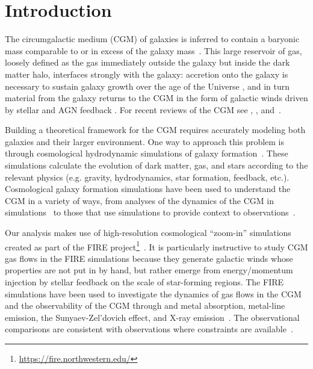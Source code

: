 \documentclass[fleqn,usenatbib]{mnras}
\begin{document}

\section{Introduction}

The circumgalactic medium (CGM) of galaxies is inferred to contain a baryonic mass comparable to or in excess of the galaxy mass~\citep[e.g.][]{Werk2014,Tumlinson2017}.
This large reservoir of gas, loosely defined as the gas immediately outside the galaxy but inside the dark matter halo, interfaces strongly with the galaxy:
accretion onto the galaxy is necessary to sustain galaxy growth over the age of the Universe \citep[e.g.][]{Prochaska2009, Bauermeister2010},
and in turn material from the galaxy returns to the CGM in the form of galactic winds driven by stellar and AGN feedback \citep[e.g.,][]{Heckman2000, Steidel2010, Jones2012, Rubin2014, Cicone2014}.
For recent reviews of the CGM see \cite{Putman2012}, \cite{Tumlinson2017}, and~\cite{Fox2017}.

Building a theoretical framework for the CGM requires accurately modeling both galaxies and their larger environment.
One way to approach this problem is through cosmological hydrodynamic simulations of galaxy formation~\citep[e.g.][]{Somerville2015}.
These simulations calculate the evolution of dark matter, gas, and stars according to the relevant physics (e.g. gravity, hydrodynamics, star formation, feedback, etc.). 
Cosmological galaxy formation simulations have been used to understand the CGM in a variety of ways, from analyses of the dynamics of the CGM in simulations~\citep[e.g.][]{Keres2005, Keres2009, Faucher-Giguere2011a, 2011MNRAS.414.2458V, Nelson2013, Oppenheimer2010, Wetzel2015, Oppenheimer2018} to those that use simulations to provide context to observations~\citep[e.g.][]{Faucher-Giguere2010, Faucher-Giguere2011,Hummels2013,Liang2015,Corlies2016, 2016MNRAS.462.2440T, Gutcke2017, Nelson2017, Roca-Fabrega2018}.

Our analysis makes use of high-resolution cosmological ``zoom-in'' simulations \citep[][]{1993ApJ...412..455K, 2014MNRAS.437.1894O} created as part of the FIRE project\footnote{\url{https://fire.northwestern.edu/}}~\citep[][]{Hopkins2014,Hopkins2017}.
It is particularly instructive to study CGM gas flows in the FIRE simulations because they generate galactic winds whose properties are not put in by hand, but rather emerge from energy/momentum injection by stellar feedback on the scale of star-forming regions. 
The FIRE simulations have been used to investigate the dynamics of gas flows in the CGM~\citep{Muratov2015,Muratov2016,Angles-Alcazar2017,Stewart2016} and the observability of the CGM through  and metal absorption, metal-line emission, the Sunyaev-Zel'dovich effect, and X-ray emission~\citep{Faucher-Giguere2015,Faucher-Giguere2016,Sravan2016,VandeVoort2016,Hafen2016}.
The observational comparisons are consistent with observations where constraints are available~\citep{Faucher-Giguere2015,Faucher-Giguere2016,Hafen2016}.
\end{document}
